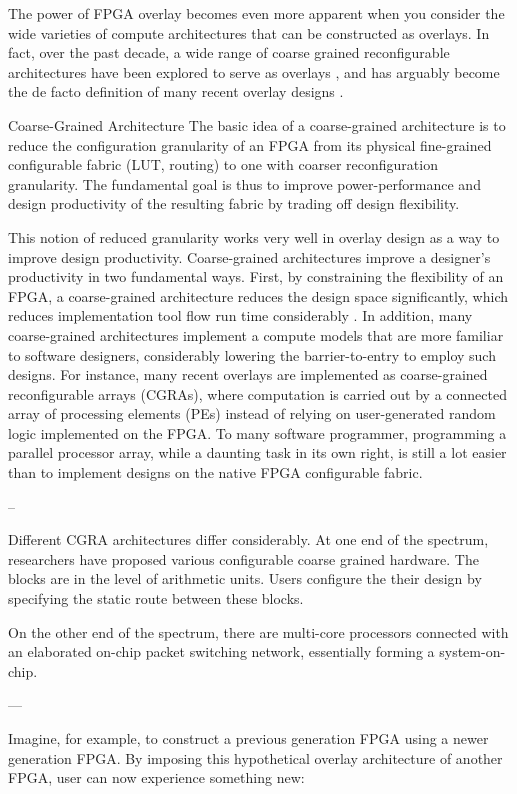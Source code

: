 The power of FPGA overlay becomes even more apparent when you consider the wide varieties of compute architectures that can be constructed as overlays.  In fact, over the past decade, a wide range of coarse grained reconfigurable architectures have been explored to serve as overlays \cite{}, and has arguably become the de facto definition of many recent overlay designs \cite{}.


Coarse-Grained Architecture
The basic idea of a coarse-grained architecture is to reduce the configuration granularity of an FPGA from its physical fine-grained configurable fabric (LUT, routing) to one with coarser reconfiguration granularity.  The fundamental goal is thus to improve power-performance and design productivity of the resulting fabric by trading off design flexibility.


This notion of reduced granularity works very well in overlay design as a way to improve design productivity.  Coarse-grained architectures improve a designer’s productivity in two fundamental ways.  First, by constraining the flexibility of an FPGA, a coarse-grained architecture reduces the design space significantly, which reduces implementation tool flow run time considerably \cite{quickdough,hmflow}. In addition, many coarse-grained architectures implement a compute models that are more familiar to software designers, considerably lowering the barrier-to-entry to employ such designs.  For instance, many recent overlays are implemented as coarse-grained reconfigurable arrays (CGRAs), where computation is carried out by a connected array of processing elements (PEs) instead of relying on user-generated random logic implemented on the FPGA.  To many software programmer, programming a parallel processor array, while a daunting task in its own right, is still a lot easier than to implement designs on the native FPGA configurable fabric.


--


Different CGRA architectures differ considerably.  At one end of the spectrum, researchers have proposed various configurable coarse grained hardware.  The blocks are in the level of arithmetic units.  Users configure the their design by specifying the static route between these blocks.


On the other end of the spectrum, there are multi-core processors connected with an elaborated on-chip packet switching network, essentially forming a system-on-chip.


---


Imagine, for example, to construct a previous generation FPGA using a newer generation FPGA.  By imposing this hypothetical overlay architecture of another FPGA, user can now experience something new:

